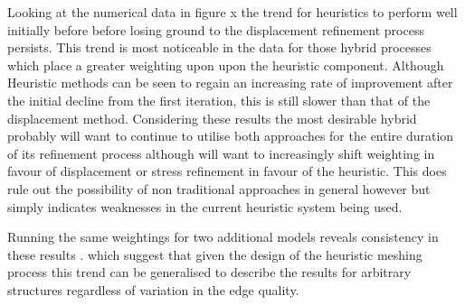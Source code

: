\noindent
Looking at the numerical data in figure x the trend for heuristics to perform well initially before before losing ground to the displacement refinement process persists. This trend is most noticeable in the data for those hybrid processes which place a greater weighting upon upon the heuristic component. Although Heuristic methods can be seen to regain an increasing rate of improvement after the initial decline from the first iteration, this is still slower than that of the displacement method. Considering these results the most desirable hybrid probably will want to continue to utilise both approaches for the entire duration of its refinement process although will want to increasingly shift weighting in favour of displacement or stress refinement in favour of the heuristic. This does rule out the possibility of non traditional approaches in general however but simply indicates weaknesses in the current heuristic system being used. 

\noindent
Running the same weightings for two additional models reveals consistency in these results . which suggest  that given the design of the heuristic meshing process this trend can be generalised to describe the results for arbitrary structures regardless of variation in the edge quality.

\noindent                                                                                                                                                      %
                                                                                                                                                       
                                                                                                                                                      
